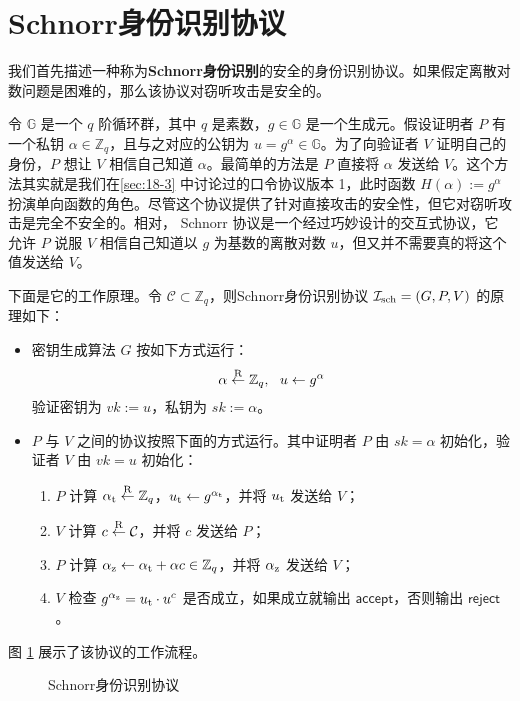 \section{Schnorr身份识别协议}

我们首先描述一种称为\textbf{Schnorr身份识别}的安全的身份识别协议。如果假定离散对数问题是困难的，那么该协议对窃听攻击是安全的。

令 $\mathbb{G}$ 是一个 $q$ 阶循环群，其中 $q$ 是素数，$g\in\mathbb{G}$ 是一个生成元。假设证明者 $P$ 有一个私钥 $\alpha\in\mathbb{Z}_q$，且与之对应的公钥为 $u=g^{\alpha}\in\mathbb{G}$。为了向验证者 $V$ 证明自己的身份，$P$ 想让 $V$ 相信自己知道 $\alpha$。最简单的方法是 $P$ 直接将 $\alpha$ 发送给 $V$。这个方法其实就是我们在\ref{sec:18-3} 中讨论过的口令协议版本 1，此时函数 $H(\alpha):=g^\alpha$扮演单向函数的角色。尽管这个协议提供了针对直接攻击的安全性，但它对窃听攻击是完全不安全的。相对， Schnorr 协议是一个经过巧妙设计的交互式协议，它允许 $P$ 说服 $V$ 相信自己知道以 $g$ 为基数的离散对数 $u$，但又并不需要真的将这个值发送给 $V$。

下面是它的工作原理。令 $\mathcal{C}\subset\mathbb{Z}_q$，则Schnorr身份识别协议 $\mathcal{I}_{\rm sch}=(G,P,V)$ 的原理如下：
\begin{itemize}
	\item 密钥生成算法 $G$ 按如下方式运行：
		$$\alpha\overset{\rm R}\leftarrow\mathbb{Z}_q, ~~ u\leftarrow g^\alpha$$
		验证密钥为 $vk:=u$，私钥为 $sk:=\alpha$。
	\item $P$ 与 $V$ 之间的协议按照下面的方式运行。其中证明者 $P$ 由 $sk=\alpha$ 初始化，验证者 $V$ 由 $vk=u$ 初始化：
	\begin{enumerate}
		\item $P$ 计算 $\alpha_{\rm t}\overset{\rm R}\leftarrow\mathbb{Z}_q$，$u_{\rm t}\leftarrow g^{\alpha_{\rm t}}$，并将 $u_{\rm t}$ 发送给 $V$；
		\item $V$ 计算 $c\overset{\rm R}\leftarrow\mathcal{C}$，并将 $c$ 发送给 $P$；
		\item $P$ 计算 $\alpha_{\rm z}\leftarrow \alpha_{\rm t}+\alpha c\in \mathbb{Z}_q$，并将 $\alpha_{\rm z}$ 发送给 $V$；
		\item $V$ 检查 $g^{\alpha_{\rm z}}=u_{\rm t}\cdot u^c$ 是否成立，如果成立就输出 $\mathsf{accept}$，否则输出 $\mathsf{reject}$。
	\end{enumerate}
\end{itemize}
图 \ref{fig:19-1} 展示了该协议的工作流程。

\begin{figure}
  \centering
  
  \caption{Schnorr身份识别协议}
  \label{fig:19-1}
\end{figure}

